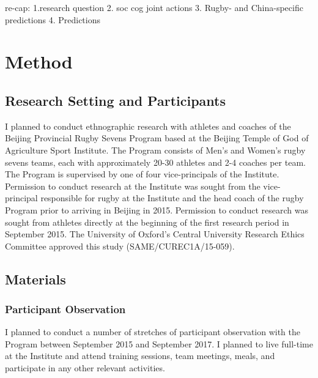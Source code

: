 re-cap:
1.research question
2. soc cog joint actions
3. Rugby-  and China-specific predictions
4. Predictions




























\section{Method}




\subsection{Research Setting and Participants}

I planned to conduct ethnographic research with athletes and coaches of the Beijing Provincial Rugby Sevens Program based at the Beijing Temple of God of Agriculture Sport Institute.  The Program consists of Men's and Women's rugby sevens teams, each with approximately 20-30 athletes and 2-4 coaches per team.  The Program is supervised by one of four vice-principals of the Institute.   Permission to conduct research at the Institute was sought from the vice-principal responsible for rugby at the Institute and the head coach of the rugby Program prior to arriving in Beijing in 2015.  Permission to conduct research was sought from athletes directly at the beginning of the first research period in September 2015. The University of Oxford’s Central University Research Ethics Committee approved this study (SAME/CUREC1A/15-059).

\subsection{Materials}

  \subsubsection{Participant Observation}
  I planned to conduct a number of stretches of participant observation with the Program between September 2015 and September 2017.  I planned to live full-time at the Institute and attend training sessions, team meetings, meals, and participate in any other relevant activities.

